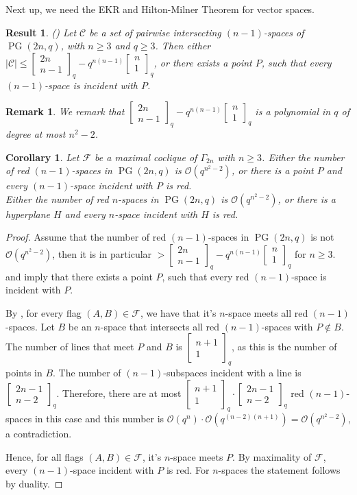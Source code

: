 \documentclass[11pt, oneside, a4paper]{article}
\newtheorem{result}[thm]{Result}
\newtheorem{cor}[thm]{Corollary}
\newtheorem{remark}[thm]{Remark}
\newcommand{\EKR}{\mathcal{F}}
\newcommand{\OO}{\mathcal{O}}
\newcommand{\Gauss}[2]{{\begin{bmatrix} #1 \\ #2 \end{bmatrix}_q}}
\DeclareMathOperator{\PG}{PG}
\begin{document}

Next up, we need the EKR and Hilton-Milner Theorem for vector spaces.

\begin{result} (\cite{hiltonmilner_vectorspaces, ekr_vectorspaces}) \label{R: EKR + HM vectorspaces}
Let $\mathcal{C}$ be a set of pairwise intersecting $(n-1)$-spaces of $\PG(2n,q)$, with $n\geq 3$ and $q\geq 3$.
Then either $|\mathcal{C}|\leq \Gauss{2n}{n-1}-q^{n(n-1)}\Gauss{n}{1}$, or there exists a point $P$, such that every $(n-1)$-space is incident with $P$.
\end{result}


\begin{remark} \label{Remark 1}
We remark that $\Gauss{2n}{n-1}-q^{n(n-1)}\Gauss{n}{1}$ is a polynomial in $q$ of degree at most $n^2-2$.
\end{remark}




\begin{cor} \label{C: number of red spaces}
Let $\EKR$ be a maximal coclique of $\Gamma_{2n}$ with $n\geq 3$.
Either the number of red $(n-1)$-spaces in $\PG(2n,q)$ is $\OO(q^{n^2-2})$, or there is a point $P$ and every $(n-1)$-space incident with $P$ is red.\\
Either the number of red $n$-spaces in $\PG(2n,q)$ is $\OO(q^{n^2-2})$, or there is a hyperplane $H$ and every $n$-space incident with $H$ is red.
\end{cor}

\begin{proof}
    Assume that the number of red $(n-1)$-spaces in $\PG(2n,q)$ is not $\OO(q^{n^2-2})$, then it is in particular $> \Gauss{2n}{n-1}-q^{n(n-1)}\Gauss{n}{1}$ for $n\geq 3$.  and  imply that there exists a point $P$, such that every red $(n-1)$-space is incident with $P$. 

    By , for every flag $(A,B)\in \EKR$, we have that it's $n$-space meets all red $(n-1)$-spaces.
    Let $B$ be an $n$-space that intersects all red $(n-1)$-spaces with $P\notin B$. The number of lines that meet $P$ and $B$ is $\Gauss{n+1}{1}$, as this is the number of points in $B$. The number of $(n-1)$-subspaces incident with a line is $\Gauss{2n-1}{n-2}$. Therefore, there are at most $\Gauss{n+1}{1}\cdot \Gauss{2n-1}{n-2}$ red $(n-1)$-spaces in this case and this number is $\OO(q^n)\cdot \OO(q^{(n-2)(n+1)})=\OO(q^{n^2-2})$, a contradiction.

Hence, for all flags $(A,B)\in \EKR$, it's $n$-space meets $P$. By maximality of $\EKR$, every $(n-1)$-space incident with $P$ is red. For $n$-spaces the statement follows by duality.
\end{proof}
\end{document}
